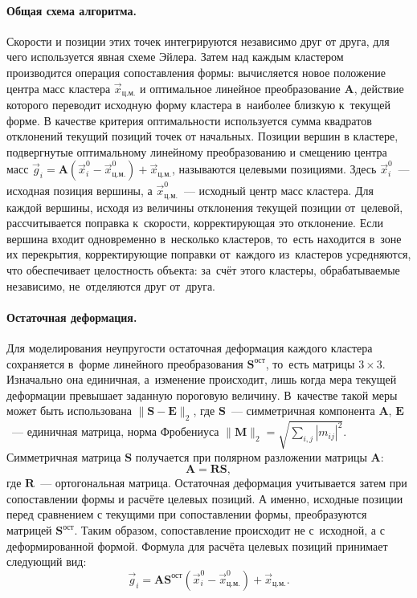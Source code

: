 \documentclass[a4paper, 14pt, titlepage]{extarticle}
\newcommand{\vect}[1]{\vec{#1}} %
\newcommand{\matx}[1]{\mathbf{#1}} %
\begin{document}
        \paragraph{Общая схема алгоритма.} Скорости и позиции этих точек интегрируются независимо
        друг от друга, для чего используется явная схеме Эйлера. Затем над каждым кластером
        производится операция сопоставления формы: вычисляется новое положение центра масс кластера
        $\vect{x}_{ц.м.}$ и оптимальное линейное преобразование $\matx A$, действие которого
        переводит исходную форму кластера в~наиболее близкую к~текущей форме. В качестве критерия
        оптимальности используется сумма квадратов отклонений текущий позиций точек от начальных. Позиции
        вершин в кластере, подвергнутые оптимальному линейному преобразованию и смещению центра масс
        $\vect{g}_i = \matx{A} (\vect{x}^0_i - \vect{x}^0_{ц.м.}) + \vect{x}_{ц.м.}$,
        называются целевыми позициями. Здесь $\vect{x}^0_i$~--- исходная позиция вершины, а
        $\vect{x}^0_{ц.м.}$~--- исходный центр масс кластера. Для каждой вершины, исходя из величины
        отклонения текущей позиции от~целевой, рассчитывается поправка к~скорости, корректирующая
        это отклонение. Если вершина входит одновременно в~несколько кластеров, то~есть находится
        в~зоне их перекрытия, корректирующие поправки от~каждого из~кластеров усредняются, что
        обеспечивает целостность объекта: за~счёт этого кластеры, обрабатываемые независимо,
        не~отделяются друг от~друга.

        \paragraph{Остаточная деформация.} Для моделирования неупругости остаточная деформация
        каждого кластера сохраняется в~форме линейного преобразования $\matx{S}^{ост}$, то~есть
        матрицы $3 \times 3$. Изначально она единичная, а~изменение происходит, лишь когда мера
        текущей деформации превышает заданную пороговую величину. В~качестве такой меры может быть
        использована $ \|\matx S - \matx E\|_2 $, где $\matx S$~--- симметричная компонента $\matx
        A$, $\matx E$~--- единичная матрица, норма Фробениуса $\|\matx M\|_2 = \sqrt{\sum_{i, j} |m_{ij}|^2}$.
        Симметричная матрица $\matx S$ получается при полярном разложении матрицы $\matx A$:
        \begin{equation}\label{eq:polar_decomposition}
          \matx A = \matx R \matx S,
        \end{equation}
        где $\matx R$~--- ортогональная матрица. Остаточная деформация учитывается затем при
        сопоставлении формы и расчёте целевых позиций. А именно, исходные позиции перед сравнением
        с текущими при сопоставлении формы, преобразуются матрицей $\matx{S}^{ост}$. Таким
        образом, сопоставление происходит не с~исходной, а с деформированной формой. Формула для
        расчёта целевых позиций принимает следующий вид:
        \begin{equation}\label{eq:goal_pos}
          \vect{g}_i = \matx{A} \matx{S}^{ост} (\vect{x}^0_i - \vect{x}^0_{ц.м.}) + \vect{x}_{ц.м.}.
        \end{equation}
\end{document}
